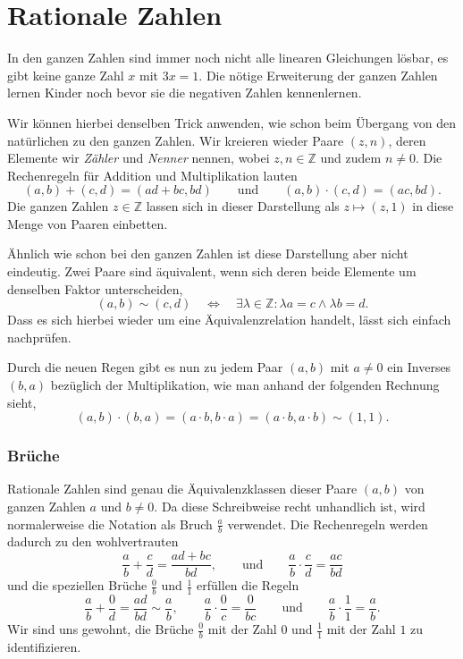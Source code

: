 %
%
%
\section{Rationale Zahlen
\label{buch:section:rationale-zahlen}}
In den ganzen Zahlen sind immer noch nicht alle linearen Gleichungen
lösbar, es gibt keine ganze Zahl $x$ mit $3x=1$.
Die nötige Erweiterung der ganzen Zahlen lernen Kinder noch bevor sie
die negativen Zahlen kennenlernen.

Wir können hierbei denselben Trick anwenden,
wie schon beim Übergang von den natürlichen zu den ganzen Zahlen.
Wir kreieren wieder Paare $(z, n)$, deren Elemente wir \emph{Zähler} und
\emph{Nenner} nennen, wobei $z, n \in \mathbb Z$ und zudem $n \ne 0$.
Die Rechenregeln für Addition und Multiplikation lauten
\[
(a, b) + (c, d)
=
(ad + bc, bd)
\qquad \text{und} \qquad
(a, b) \cdot (c, d)
=
(ac, bd)
.
\]
Die ganzen Zahlen $z\in\mathbb{Z}$ lassen sich in dieser Darstellung als
$z \mapsto (z, 1)$ in diese Menge von Paaren einbetten.

Ähnlich wie schon bei den ganzen Zahlen ist diese Darstellung
aber nicht eindeutig.
Zwei Paare sind äquivalent, wenn sich deren beide Elemente um denselben Faktor
unterscheiden,
\[
(a, b)
\sim
(c, d)
\quad \Leftrightarrow \quad
\exists \lambda \in \mathbb Z \colon
\lambda a = c
\wedge
\lambda b = d
.
\]
Dass es sich hierbei wieder um eine Äquivalenzrelation handelt, lässt sich
einfach nachprüfen.

Durch die neuen Regen gibt es nun zu jedem Paar $(a, b)$ mit $a \ne 0$
ein Inverses $(b, a)$ bezüglich der Multiplikation,
wie man anhand der folgenden Rechnung sieht,
\[
(a, b) \cdot (b, a)
=
(a \cdot b, b \cdot a)
=
(a \cdot b, a \cdot b)
\sim
(1, 1)
.
\]

\subsubsection{Brüche}
Rationale Zahlen sind genau die Äquivalenzklassen dieser Paare $(a, b)$ von
ganzen Zahlen $a$ und $b\ne 0$.
Da diese Schreibweise recht unhandlich ist, wird normalerweise die Notation
als Bruch $\frac{a}{b}$ verwendet.
%
Die Rechenregeln werden dadurch zu den wohlvertrauten
\[
\frac{a}{b}+\frac{c}{d}
=
\frac{ad+bc}{bd},
\qquad\text{und}\qquad
\frac{a}{b}\cdot\frac{c}{d}
=
\frac{ac}{bd}
\]
und die speziellen Brüche $\frac{0}{b}$ und $\frac{1}{1}$ erfüllen die
Regeln
\[
\frac{a}{b}+\frac{0}{d} = \frac{ad}{bd} \sim \frac{a}{b},
\qquad
\frac{a}{b}\cdot \frac{0}{c} = \frac{0}{bc}
\qquad\text{und}\qquad
\frac{a}{b}\cdot \frac{1}{1} = \frac{a}{b}.
\]
Wir sind uns gewohnt, die Brüche $\frac{0}{b}$ mit der Zahl $0$ und
$\frac{1}{1}$ mit der Zahl $1$ zu identifizieren.

